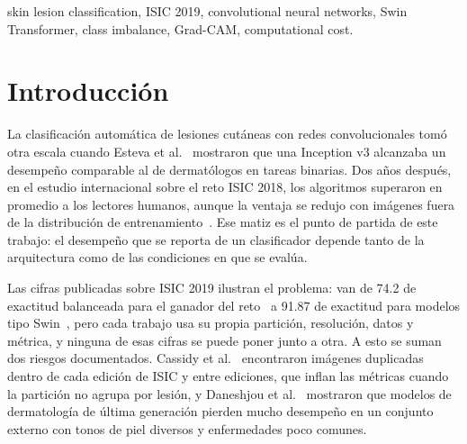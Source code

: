 \documentclass[conference]{IEEEtran}
\begin{document}
\begin{otherlanguage}{english}
\begin{abstract}
Comparisons between convolutional networks and Transformers for dermoscopy usually rely on different splits, resolutions and metrics, so their figures cannot be contrasted. This work compares ResNet50, EfficientNet-B0 and Swin-T on ISIC 2019 (eight classes, 25,331 images) under a single protocol: a 70/15/15 split grouped by lesion, the same hyperparameters for the three models, three seeds, and the official challenge test set without the UNK class (6,191 images) as external evaluation. Swin-T achieves the best macro F1 on the internal test set, 58.9~$\pm$~1.5, against 53.2~$\pm$~0.5 for EfficientNet-B0 and 52.0~$\pm$~1.4 for ResNet50, and keeps the ranking on the official test set (58.5). EfficientNet-B0 needs 0.4 GMACs per image and processes 3,096 images per second, and averaging three of its seeds reaches 56.7. Removing class weighting raises accuracy but lowers the balanced accuracy of ResNet50 from 58.4 to 48.7. Grad-CAM yields comparable maps for both CNNs and window artifacts for Swin-T.
\end{abstract}
\renewcommand{\IEEEkeywordsname}{Index Terms}
\begin{IEEEkeywords}
skin lesion classification, ISIC 2019, convolutional neural networks, Swin Transformer, class imbalance, Grad-CAM, computational cost.
\end{IEEEkeywords}
\end{otherlanguage}

\section{Introducción}

La clasificación automática de lesiones cutáneas con redes convolucionales tomó otra escala cuando Esteva et al.~\cite{esteva2017dermatologist} mostraron que una Inception v3 alcanzaba un desempeño comparable al de dermatólogos en tareas binarias. Dos años después, en el estudio internacional sobre el reto ISIC 2018, los algoritmos superaron en promedio a los lectores humanos, aunque la ventaja se redujo con imágenes fuera de la distribución de entrenamiento~\cite{tschandl2019comparison}. Ese matiz es el punto de partida de este trabajo: el desempeño que se reporta de un clasificador depende tanto de la arquitectura como de las condiciones en que se evalúa.

Las cifras publicadas sobre ISIC 2019 ilustran el problema: van de 74.2 de exactitud balanceada para el ganador del reto~\cite{gessert2020isic} a 91.87 de exactitud para modelos tipo Swin~\cite{aruk2026comparison,ayas2023swin}, pero cada trabajo usa su propia partición, resolución, datos y métrica, y ninguna de esas cifras se puede poner junto a otra. A esto se suman dos riesgos documentados. Cassidy et al.~\cite{cassidy2022isic} encontraron imágenes duplicadas dentro de cada edición de ISIC y entre ediciones, que inflan las métricas cuando la partición no agrupa por lesión, y Daneshjou et al.~\cite{daneshjou2022disparities} mostraron que modelos de dermatología de última generación pierden mucho desempeño en un conjunto externo con tonos de piel diversos y enfermedades poco comunes.
\end{document}
